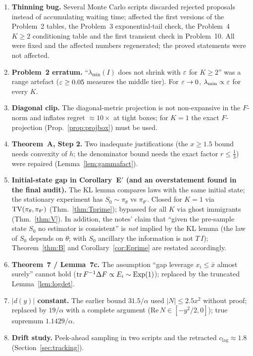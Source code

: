 \begin{enumerate}[nosep]
\item \textbf{Thinning bug.} Several Monte Carlo scripts discarded rejected proposals instead of accumulating waiting time; affected the first versions of the Problem~2 tables, the Problem~3 exponential-tail check, the Problem~4 $K\ge2$ conditioning table and the first transient check in Problem~10. All were fixed and the affected numbers regenerated; the proved statements were not affected.
\item \textbf{Problem~2 erratum.} ``$\lambda_{\min}(I)$ does not shrink with $\varepsilon$ for $K\ge2$'' was a range artefact ($\varepsilon\ge0.05$ measures the middle tier). For $\varepsilon\to0$, $\lambda_{\min}\propto\varepsilon$ for every $K$.
\item \textbf{Diagonal clip.} The diagonal-metric projection is not non-expansive in the $F$-norm and inflates regret $\approx10\times$ at tight boxes; for $K=1$ the exact $F$-projection (Prop.~\ref{prop:projbox}) must be used.
\item \textbf{Theorem~A, Step 2.} Two inadequate justifications (the $x\ge1.5$ bound needs convexity of $h$; the denominator bound needs the exact factor $r\le\frac13$) were repaired (Lemma~\ref{lem:gammafact}).
\item \textbf{Initial-state gap in Corollary~E$'$ (and an overstatement found in the final audit).} The KL lemma compares laws with the same initial state; the stationary experiment has $S_0\sim\pi_\theta$ vs $\pi_{\theta'}$. Closed for $K=1$ via $\mathrm{TV}(\pi_\theta,\pi_{\theta'})$ (Thm.~\ref{thm:Tprime}); bypassed for all $K$ via ghost immigrants (Thm.~\ref{thm:V}). In addition, the notes' claim that ``given the pre-sample state $S_0$ no estimator is consistent'' is \emph{not} implied by the KL lemma (the law of $S_0$ depends on $\theta$; with $S_0$ ancillary the information is not $T\,I$); Theorem~\ref{thm:B} and Corollary~\ref{cor:Eprime} are restated accordingly.
\item \textbf{Theorem~7 / Lemma~7c.} The assumption ``gap leverage $x_i\le\bar x$ almost surely'' cannot hold ($\operatorname{tr} F^{-1}\Delta F\propto E_i\sim\mathrm{Exp}(1)$); replaced by the truncated Lemma~\ref{lem:logdet}.
\item \textbf{$|d(y)|$ constant.} The earlier bound $31.5/\alpha$ used $|N|\le2.5x^2$ without proof; replaced by $19/\alpha$ with a complete argument ($\mathrm{Re}\,N\in[-y^2/2,0]$); true supremum $1.1429/\alpha$.
\item \textbf{Drift study.} Peek-ahead sampling in two scripts and the retracted $c_{\mathrm{lag}}\approx1.8$ (Section~\ref{sec:tracking}).

\end{enumerate}
